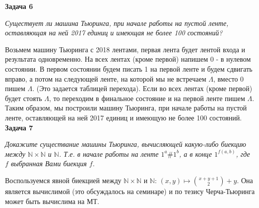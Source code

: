 \documentclass{article}
\begin{document}
\newline \newline
 \noindent \textbf{Задача 6}
\begin{center}
\textit{Существует ли машина Тьюринга, при начале работы на пустой ленте, оставляющая на ней 2017 единиц и имеющая не более 100 состояний?}
\end{center}
Возьмем машину Тьюринга с 2018 лентами, первая лента будет лентой входа и результата одновременно. На всех лентах (кроме первой) напишем 0 - в нулевом состоянии. В первом состоянии будем писать 1 на первой ленте и будем сдвигать вправо, а потом на следующей ленте, на которой мы не встречаем $\Lambda$, вместо 0 пишем $\Lambda$. (Это задается таблицей перехода). Если во всех лентах (кроме первой) будет стоять $\Lambda$, то переходим в финальное состояние и на первой ленте пишем $\Lambda$. Таким образом, мы построили машину Тьюринга, при начале работы на пустой ленте, оставляющей на ней 2017 единиц и имеющую не более 100 состояний.
\newline
\newline
 \noindent \textbf{Задача 7}
\begin{center}
\textit{Докажите существание машины Тьюринга, вычисляющей какую-либо биекцию между $\mathbb{N} \times  \mathbb{N}$ и $\mathbb{N}$. Т.е. в начале работы на ленте $1^a\#1^b$, а в конце $1^{f(a,b)}$, где $f$   выбранная Вами биекция $f$.}
\end{center}
Воспользуемся явной биекцией между $\mathbb{N} \times  \mathbb{N}$ и $\mathbb{N}$: $(x,y) \mapsto \binom{x+y+1}{2}+y$. Она является вычислимой (это обсуждалось на семинаре) и по тезису Черча-Тьюринга может быть вычислима на МТ. 
\newline
\newline 
\end{document}

